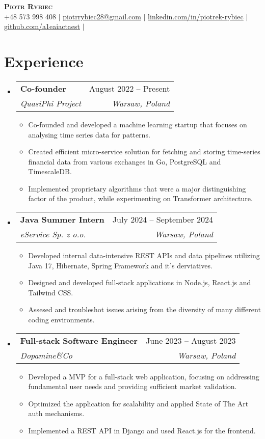 \documentclass[letterpaper,11pt]{article}
\makeatletter
\newcommand{\resumeItem}[1]{
  \item\small{
    {#1 \vspace{-2pt}}
  }
}
\newcommand{\resumeSubheading}[4]{
  \vspace{-2pt}\item
    \begin{tabular*}{0.97\textwidth}[t]{l@{\extracolsep{\fill}}r}
      \textbf{#1} & #2 \\
      \textit{\small#3} & \textit{\small #4} \\
    \end{tabular*}\vspace{-7pt}
}
\newcommand{\resumeSubHeadingListStart}{\begin{itemize}[leftmargin=0.15in, label={}]}
\newcommand{\resumeSubHeadingListEnd}{\end{itemize}}
\newcommand{\resumeItemListStart}{\begin{itemize}}
\newcommand{\resumeItemListEnd}{\end{itemize}\vspace{-5pt}}
\makeatother
\begin{document}
\begin{center}
  \textbf{\Huge \scshape Piotr Rybiec} \\ \vspace{1pt}
  \small +48 573 998 408 $|$ \href{mailto:piotrrybiec28@gmail.com}{\underline{piotrrybiec28@gmail.com}} $|$
  \href{https://linkedin.com/in/piotrek-rybiec}{\underline{linkedin.com/in/piotrek-rybiec}} $|$
  \href{https://github.com/a1eaiactaest}{\underline{github.com/a1eaiactaest}} $|$
\end{center}

\section{Experience}
  \resumeSubHeadingListStart
    \resumeSubheading
      {Co-founder}{August 2022 -- Present}
      {QuasiPhi Project}{Warsaw, Poland}
      \resumeItemListStart
        \resumeItem{Co-founded and developed a machine learning startup that focuses on analysing time series data for patterns.}
        \resumeItem{Created efficient micro-service solution for fetching and storing time-series financial data from various exchanges in Go, PostgreSQL and TimescaleDB.}
        \resumeItem{Implemented proprietary algorithms that were a major distinguishing factor of the product, while experimenting on Transformer architecture.}
      \resumeItemListEnd
    \resumeSubheading
      {Java Summer Intern}{July 2024 -- September 2024}
      {eService Sp. z o.o.}{Warsaw, Poland}
      \resumeItemListStart
        \resumeItem{Developed internal data-intensive REST APIs and data pipelines utilizing Java 17, Hibernate, Spring Framework and it's derviatives.}
        \resumeItem{Designed and developed full-stack applications in Node.js, React.js and Tailwind CSS.}
        \resumeItem{Assesed and troubleshot issues arising from the diversity of many different coding environments.}
      \resumeItemListEnd
    \resumeSubheading
      {Full-stack Software Engineer}{June 2023 -- August 2023}
      {Dopamine\&Co}{Warsaw, Poland}
      \resumeItemListStart
        \resumeItem{Developed a MVP for a full-stack web application, focusing on addressing fundamental user needs and providing sufficient market validation.}
        \resumeItem{Optimized the application for scalability and applied State of The Art auth mechanisms.}
        \resumeItem{Implemented a REST API in Django and used React.js for the frontend.}
      \resumeItemListEnd
  \resumeSubHeadingListEnd
\end{document}
